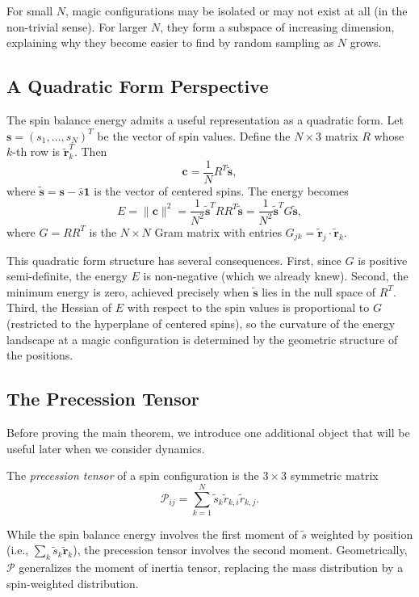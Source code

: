 For small $N$, magic configurations may be isolated or may not exist at all (in the non-trivial sense). For larger $N$, they form a subspace of increasing dimension, explaining why they become easier to find by random sampling as $N$ grows.

\subsection{A Quadratic Form Perspective}

The spin balance energy admits a useful representation as a quadratic form. Let $\mathbf{s} = (s_1, \ldots, s_N)^T$ be the vector of spin values. Define the $N \times 3$ matrix $R$ whose $k$-th row is $\tilde{\mathbf{r}}_k^T$. Then
\[
\mathbf{c} = \frac{1}{N} R^T \tilde{\mathbf{s}},
\]
where $\tilde{\mathbf{s}} = \mathbf{s} - \bar{s} \mathbf{1}$ is the vector of centered spins. The energy becomes
\[
E = \|\mathbf{c}\|^2 = \frac{1}{N^2} \tilde{\mathbf{s}}^T R R^T \tilde{\mathbf{s}} = \frac{1}{N^2} \tilde{\mathbf{s}}^T G \tilde{\mathbf{s}},
\]
where $G = R R^T$ is the $N \times N$ Gram matrix with entries $G_{jk} = \tilde{\mathbf{r}}_j \cdot \tilde{\mathbf{r}}_k$.

This quadratic form structure has several consequences. First, since $G$ is positive semi-definite, the energy $E$ is non-negative (which we already knew). Second, the minimum energy is zero, achieved precisely when $\tilde{\mathbf{s}}$ lies in the null space of $R^T$. Third, the Hessian of $E$ with respect to the spin values is proportional to $G$ (restricted to the hyperplane of centered spins), so the curvature of the energy landscape at a magic configuration is determined by the geometric structure of the positions.

\subsection{The Precession Tensor}
\label{sec:tensor}

Before proving the main theorem, we introduce one additional object that will be useful later when we consider dynamics.

\begin{definition}
The \emph{precession tensor} of a spin configuration is the $3 \times 3$ symmetric matrix
\[
\mathcal{P}_{ij} = \sum_{k=1}^N \tilde{s}_k \tilde{r}_{k,i} \tilde{r}_{k,j}.
\]
\end{definition}

While the spin balance energy involves the first moment of $\tilde{s}$ weighted by position (i.e., $\sum_k \tilde{s}_k \tilde{\mathbf{r}}_k$), the precession tensor involves the second moment. Geometrically, $\mathcal{P}$ generalizes the moment of inertia tensor, replacing the mass distribution by a spin-weighted distribution.

